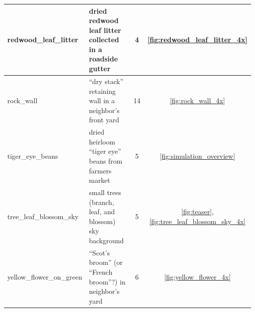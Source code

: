 \documentclass[letterpaper]{article}
\begin{document}
\begin{minipage}{\linewidth}
\begin{table}[H]
\begin{tabular}{ |l|l|c|c| }
        \hline
        redwood\_leaf\_litter &
            dried redwood leaf litter collected in a roadside gutter &
            4 & \ref{fig:redwood_leaf_litter_4x} \\
        \hline
        rock\_wall &
            “dry stack” retaining wall in a neighbor's front yard &
            14 & \ref{fig:rock_wall_4x} \\
        \hline
        tiger\_eye\_beans &
            dried heirloom “tiger eye” beans from farmers market  &
            5 & \ref{fig:simulation_overview} \\
        \hline
        tree\_leaf\_blossom\_sky &
            small trees (branch, leaf, and blossom) sky background &
            5 & \ref{fig:teaser}, \ref{fig:tree_leaf_blossom_sky_4x} \\
        \hline
        yellow\_flower\_on\_green &
            “Scot's broom” (or “French broom”?) in neighbor's yard &
            6 & \ref{fig:yellow_flower_4x} \\
        \hline
    \end{tabular}
    \label{table:background_sets}
\end{table}
\end{minipage}
\end{document}
